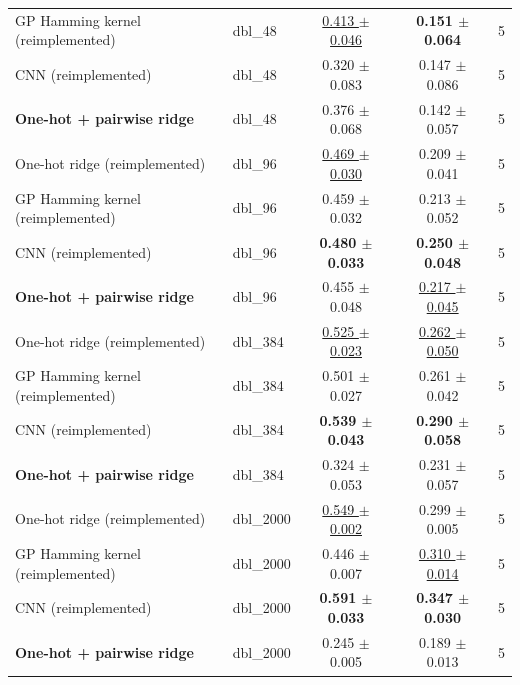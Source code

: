 \begin{tabular}{llccc}
GP Hamming kernel (reimplemented) & dbl\_48 & \underline{0.413 $\pm$ 0.046} & \textbf{0.151 $\pm$ 0.064} & 5 \\
CNN (reimplemented) & dbl\_48 & 0.320 $\pm$ 0.083 & 0.147 $\pm$ 0.086 & 5 \\
\textbf{One-hot + pairwise ridge} & dbl\_48 & 0.376 $\pm$ 0.068 & 0.142 $\pm$ 0.057 & 5 \\
\midrule
One-hot ridge (reimplemented) & dbl\_96 & \underline{0.469 $\pm$ 0.030} & 0.209 $\pm$ 0.041 & 5 \\
GP Hamming kernel (reimplemented) & dbl\_96 & 0.459 $\pm$ 0.032 & 0.213 $\pm$ 0.052 & 5 \\
CNN (reimplemented) & dbl\_96 & \textbf{0.480 $\pm$ 0.033} & \textbf{0.250 $\pm$ 0.048} & 5 \\
\textbf{One-hot + pairwise ridge} & dbl\_96 & 0.455 $\pm$ 0.048 & \underline{0.217 $\pm$ 0.045} & 5 \\
\midrule
One-hot ridge (reimplemented) & dbl\_384 & \underline{0.525 $\pm$ 0.023} & \underline{0.262 $\pm$ 0.050} & 5 \\
GP Hamming kernel (reimplemented) & dbl\_384 & 0.501 $\pm$ 0.027 & 0.261 $\pm$ 0.042 & 5 \\
CNN (reimplemented) & dbl\_384 & \textbf{0.539 $\pm$ 0.043} & \textbf{0.290 $\pm$ 0.058} & 5 \\
\textbf{One-hot + pairwise ridge} & dbl\_384 & 0.324 $\pm$ 0.053 & 0.231 $\pm$ 0.057 & 5 \\
\midrule
One-hot ridge (reimplemented) & dbl\_2000 & \underline{0.549 $\pm$ 0.002} & 0.299 $\pm$ 0.005 & 5 \\
GP Hamming kernel (reimplemented) & dbl\_2000 & 0.446 $\pm$ 0.007 & \underline{0.310 $\pm$ 0.014} & 5 \\
CNN (reimplemented) & dbl\_2000 & \textbf{0.591 $\pm$ 0.033} & \textbf{0.347 $\pm$ 0.030} & 5 \\
\textbf{One-hot + pairwise ridge} & dbl\_2000 & 0.245 $\pm$ 0.005 & 0.189 $\pm$ 0.013 & 5 \\
\bottomrule
\end{tabular}
